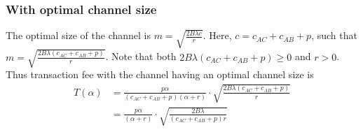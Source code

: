 \documentclass[12pt]{article}
\theoremstyle{plain}
\theoremstyle{remark}
\theoremstyle{definition}
\renewcommand{\geq}{\geqslant}
\renewcommand{\geq}{\geqslant}
\begin{document}
\subsubsection{With optimal channel size}
The optimal size of the channel is $m=\sqrt{\frac{2B\lambda c}{r}}$. Here, $c=c_{AC}+c_{AB}+p$, such that $m=\sqrt{\frac{2B\lambda (c_{AC}+c_{AB}+p)}{r}}$. Note that both $2B\lambda (c_{AC}+c_{AB}+p)\geq 0$ and $r> 0$.
\\ Thus transaction fee with the channel having an optimal channel size is 
\begin{align}
    T(\alpha) &= \frac{p\alpha}{(c_{AC}+c_{AB}+p)(\alpha+r)} \cdot \sqrt{\frac{2B\lambda (c_{AC}+c_{AB}+p)}{r}}\\
    & = \frac{p\alpha}{(\alpha+r)} \cdot \sqrt{\frac{2B\lambda }{(c_{AC}+c_{AB}+p)r}}
\end{align}
\end{document}
